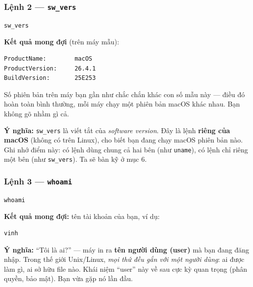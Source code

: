 \documentclass[12pt,a4paper]{article}
\begin{document}
\subsubsection{Lệnh 2 — \texttt{sw\_vers}}

\begin{labbox}[Lệnh]
\begin{verbatim}
sw_vers
\end{verbatim}
\end{labbox}

\textbf{Kết quả mong đợi} (trên máy mẫu):

\begin{termbox}
\begin{verbatim}
ProductName:        macOS
ProductVersion:     26.4.1
BuildVersion:       25E253
\end{verbatim}
\end{termbox}

\begin{notebox}
Số phiên bản trên máy bạn gần như chắc chắn khác con số mẫu này — điều đó hoàn toàn bình thường, mỗi máy chạy một phiên bản macOS khác nhau. Bạn không gõ nhầm gì cả.
\end{notebox}

\textbf{Ý nghĩa:} \texttt{sw\_vers} là viết tắt của \textit{software version}. Đây là lệnh \textbf{riêng của macOS} (không có trên Linux), cho biết bạn đang chạy macOS phiên bản nào. Ghi nhớ điểm này: có lệnh dùng chung cả hai bên (như \texttt{uname}), có lệnh chỉ riêng một bên (như \texttt{sw\_vers}). Ta sẽ bàn kỹ ở mục 6.

\subsubsection{Lệnh 3 — \texttt{whoami}}

\begin{labbox}[Lệnh]
\begin{verbatim}
whoami
\end{verbatim}
\end{labbox}

\textbf{Kết quả mong đợi:} tên tài khoản của bạn, ví dụ:

\begin{termbox}
\begin{verbatim}
vinh
\end{verbatim}
\end{termbox}

\textbf{Ý nghĩa:} ``Tôi là ai?'' — máy in ra \textbf{tên người dùng (user)} mà bạn đang đăng nhập. Trong thế giới Unix/Linux, \textit{mọi thứ đều gắn với một người dùng}: ai được làm gì, ai sở hữu file nào. Khái niệm ``user'' này về sau cực kỳ quan trọng (phân quyền, bảo mật). Bạn vừa gặp nó lần đầu.
\end{document}
